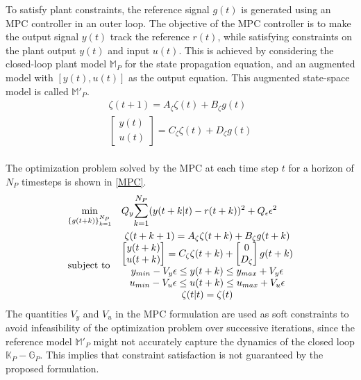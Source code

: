 \documentclass[letterpaper, 10 pt, conference]{ieeeconf}  %
\begin{document}
	To satisfy plant constraints, the reference signal $g(t)$ is generated using an MPC controller in an outer loop. The objective of the MPC controller is to make the output signal $y(t)$ track the reference $r(t)$, while satisfying constraints on the plant output $y(t)$ and input $u(t)$. This is achieved by considering the closed-loop plant model $\mathbb{M}_P$ for the state propagation equation, and an augmented model with $[y(t),u(t)]$ as the output equation. This augmented state-space model is called $\mathbb{M}'_P$.
	\begin{equation*}
	\begin{matrix}
	\zeta(t+1) = A_\zeta\zeta(t) + B_\zeta g(t)\\
	\begin{bmatrix}y(t)\\u(t)\end{bmatrix} = C_\zeta\zeta(t) + D_\zeta g(t)
	\end{matrix}
	\end{equation*}
	\\
	The optimization problem solved by the MPC at each time step $t$ for a horizon of $N_P$ timesteps is shown in \eqref{MPC}.
	\begin{equation}
	\begin{aligned}
	& \underset{\{g(t+k)\}_{k=1}^{N_P}}{\text{min}}
	& & Q_y\mathlarger{\sum\limits_{k=1}^{N_P}}(y(t+k|t)-r(t+k))^2 + Q_{\epsilon}\epsilon^2 \\
	& \text{subject to}
	& & 
	\begin{matrix}
	\zeta(t+k+1) = A_\zeta\zeta(t+k) + B_\zeta g(t+k)\\
	\begin{bmatrix}y(t+k)\\u(t+k)\end{bmatrix} = C_\zeta\zeta(t+k) + \begin{bmatrix}0\\D_\zeta\end{bmatrix}g(t+k)\\
	y_{min}-V_y\epsilon \leq y(t+k) \leq y_{max}+V_y\epsilon \\
	u_{min}-V_u\epsilon \leq u(t+k) \leq u_{max}+V_u\epsilon \\
	\zeta(t|t) = \zeta(t)
	\end{matrix}
	\end{aligned}
	\label{MPC}
	\end{equation}
	The quantities $V_y$ and $V_u$ in the MPC formulation are used as soft constraints to avoid infeasibility of the optimization problem over successive iterations, since the reference model $\mathbb{M}'_P$ might not accurately capture the dynamics of the closed loop $\mathbb{K}_P-\mathbb{G}_P$. This implies that constraint satisfaction is not guaranteed by the proposed formulation. 
	
\end{document}
